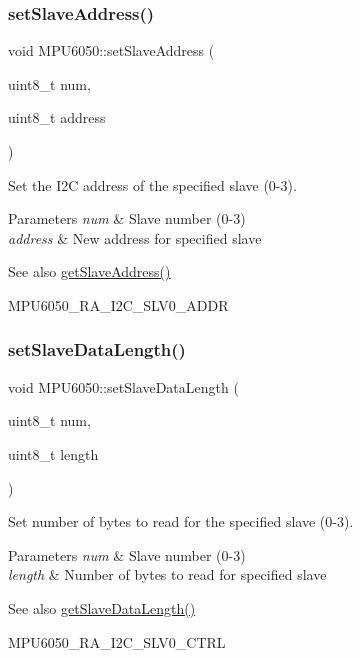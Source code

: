 \subsubsection{\texorpdfstring{setSlaveAddress()}{setSlaveAddress()}}
{\footnotesize\ttfamily void M\+P\+U6050\+::set\+Slave\+Address (\begin{DoxyParamCaption}\item[{uint8\+\_\+t}]{num,  }\item[{uint8\+\_\+t}]{address }\end{DoxyParamCaption})}

Set the I2C address of the specified slave (0-\/3). 
\begin{DoxyParams}{Parameters}
{\em num} & Slave number (0-\/3) \\
\hline
{\em address} & New address for specified slave \\
\hline
\end{DoxyParams}
\begin{DoxySeeAlso}{See also}
\mbox{\hyperlink{class_m_p_u6050_af75b9f7ccac48515c7544238db0e6863}{get\+Slave\+Address()}} 

M\+P\+U6050\+\_\+\+R\+A\+\_\+\+I2\+C\+\_\+\+S\+L\+V0\+\_\+\+A\+D\+DR 
\end{DoxySeeAlso}
\mbox{\label{class_m_p_u6050_ab4151353f433c533246d938fc3b78458}} 
\subsubsection{\texorpdfstring{setSlaveDataLength()}{setSlaveDataLength()}}
{\footnotesize\ttfamily void M\+P\+U6050\+::set\+Slave\+Data\+Length (\begin{DoxyParamCaption}\item[{uint8\+\_\+t}]{num,  }\item[{uint8\+\_\+t}]{length }\end{DoxyParamCaption})}

Set number of bytes to read for the specified slave (0-\/3). 
\begin{DoxyParams}{Parameters}
{\em num} & Slave number (0-\/3) \\
\hline
{\em length} & Number of bytes to read for specified slave \\
\hline
\end{DoxyParams}
\begin{DoxySeeAlso}{See also}
\mbox{\hyperlink{class_m_p_u6050_a54c2a48b3cb79106bcaf75accf6cd311}{get\+Slave\+Data\+Length()}} 

M\+P\+U6050\+\_\+\+R\+A\+\_\+\+I2\+C\+\_\+\+S\+L\+V0\+\_\+\+C\+T\+RL 
\end{DoxySeeAlso}
\mbox{\label{class_m_p_u6050_a471929d7cf9049357c345633d22412a9}} 
